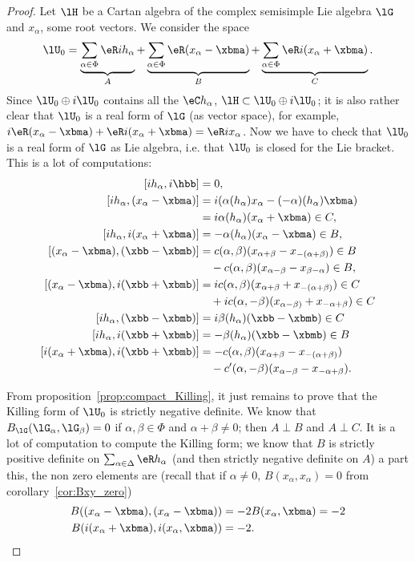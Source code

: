 \begin{proof}
	Let $\lH$ be a Cartan algebra of the complex semisimple Lie algebra $\lG$ and $ x_{\alpha}$, some root vectors. We consider the space
	\begin{equation}
		\lU_0=\underbrace{\sum_{\alpha\in\Phi}\eR ih_{\alpha}}_A+\underbrace{\sum_{\alpha\in\Phi}\eR( x_{\alpha}-\xbma)}_B+\underbrace{\sum_{\alpha\in\Phi}\eR i( x_{\alpha}+\xbma)}_C.
	\end{equation}
	Since $\lU_0\oplus i\lU_0$ contains all the $\eC h_{\alpha}$, $\lH\subset\lU_0\oplus i\lU_0$; it is also rather clear that $\lU_0$ is a real form of $\lG$ (as vector space), for example, $i\eR( x_{\alpha}-\xbma)+\eR i( x_{\alpha}+\xbma)=\eR i x_{\alpha}$. Now we have to check that $\lU_0$ is a real form of $\lG$ as Lie algebra, i.e. that $\lU_0$ is closed for the Lie bracket. This is a lot of computations:
	\[
		\begin{split}
			[i h_{\alpha},i\hbb]               &=0,\\
			[i h_{\alpha},( x_{\alpha}-\xbma)]        &=i(\alpha( h_{\alpha}) x_{\alpha}-(-\alpha)( h_{\alpha})\xbma)\\
			&=i\alpha( h_{\alpha})( x_{\alpha}+\xbma)\in C,\\
			[i h_{\alpha},i( x_{\alpha}+\xbma)]       &=-\alpha( h_{\alpha})( x_{\alpha}-\xbma)\in B,\\
			[( x_{\alpha}-\xbma),(\xbb-\xbmb)] &=c(\alpha,\beta)( x_{\alpha+\beta}-x_{-(\alpha+\beta)} )\in B\\
			&\quad -c(\alpha,\beta)(x_{\alpha-\beta}-x_{\beta-\alpha})\in B,\\
			[( x_{\alpha}-\xbma),i(\xbb+\xbmb)]&=ic(\alpha,\beta)(x_{\alpha+\beta}+x_{-(\alpha+\beta)})\in C\\
			&\quad +ic(\alpha,-\beta)(x_{\alpha-\beta)}+x_{-\alpha+\beta})\in C\\
			[i h_{\alpha},(\xbb-\xbmb)]     &=i\beta( h_{\alpha})(\xbb-\xbmb)\in C\\
			[i h_{\alpha},i(\xbb+\xbmb)]       &=-\beta( h_{\alpha})(\xbb-\xbmb)\in B\\
			[i( x_{\alpha}+\xbma),i(\xbb+\xbmb)]&=-c(\alpha,\beta)(x_{\alpha+\beta}-x_{-(\alpha+\beta)})\\
			&\quad -c'(\alpha,-\beta)(x_{\alpha-\beta}-x_{-\alpha+\beta}).
		\end{split}
	\]

	From proposition~\ref{prop:compact_Killing}, it just remains to prove that the Killing form of $\lU_0$ is strictly negative definite. We know that $B_{\lG}(\lG_{\alpha},\lG_{\beta})=0$ if $\alpha,\beta\in\Phi$ and $\alpha+\beta\neq 0$; then $A\perp B$ and $A\perp C$. It is a lot of computation to compute the Killing form; we know that $B$ is strictly positive definite on $\sum_{\alpha\in\Delta}\eR h_{\alpha}$ (and then strictly negative definite on $A$) a part this, the non zero elements are (recall that if $\alpha\neq 0$, $B( x_{\alpha}, x_{\alpha})=0$ from corollary~\ref{cor:Bxy_zero})
	\[
		\begin{split}
			B( ( x_{\alpha}-\xbma),( x_{\alpha}-\xbma) )&=-2B( x_{\alpha},\xbma)=-2\\
			B(i( x_{\alpha}+\xbma),i( x_{\alpha},\xbma))&=-2.
		\end{split}
	\]


\end{proof}
